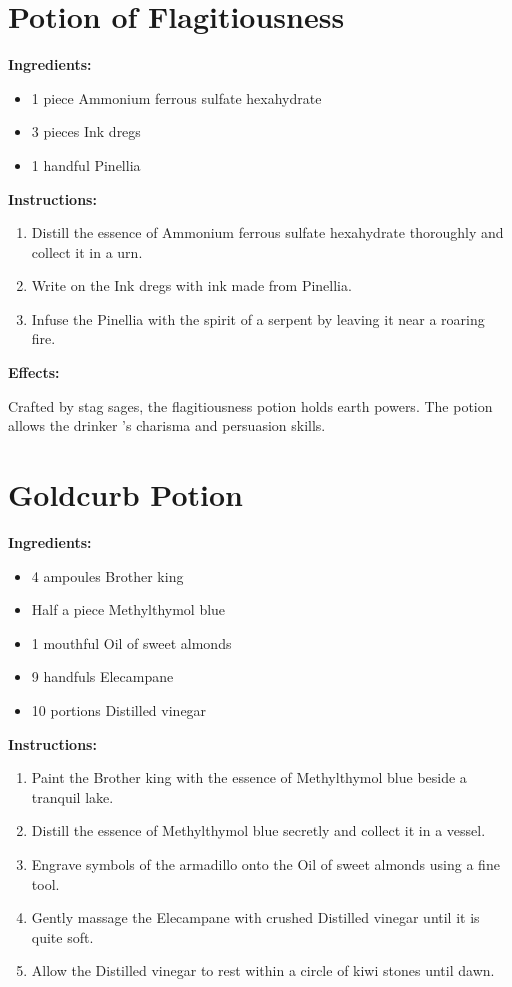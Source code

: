 \documentclass{article}
\begin{document}
\newpage
\section*{Potion of Flagitiousness}

\textbf{Ingredients:}

\begin{itemize}
  \item 1 piece Ammonium ferrous sulfate hexahydrate
  \item 3 pieces Ink dregs
  \item 1 handful Pinellia
\end{itemize}

\textbf{Instructions:}

\begin{enumerate}
  \item Distill the essence of Ammonium ferrous sulfate hexahydrate thoroughly and collect it in a urn.
  \item Write on the Ink dregs with ink made from Pinellia.
  \item Infuse the Pinellia with the spirit of a serpent by leaving it near a roaring fire.
\end{enumerate}

\textbf{Effects:}

Crafted by stag sages, the flagitiousness potion holds earth powers. The potion allows the drinker 's charisma and persuasion skills.

\newpage
\section*{Goldcurb Potion}

\textbf{Ingredients:}

\begin{itemize}
  \item 4 ampoules Brother king
  \item Half a piece Methylthymol blue
  \item 1 mouthful Oil of sweet almonds
  \item 9 handfuls Elecampane
  \item 10 portions Distilled vinegar
\end{itemize}

\textbf{Instructions:}

\begin{enumerate}
  \item Paint the Brother king with the essence of Methylthymol blue beside a tranquil lake.
  \item Distill the essence of Methylthymol blue secretly and collect it in a vessel.
  \item Engrave symbols of the armadillo onto the Oil of sweet almonds using a fine tool.
  \item Gently massage the Elecampane with crushed Distilled vinegar until it is quite soft.
  \item Allow the Distilled vinegar to rest within a circle of kiwi stones until dawn.
\end{enumerate}
\end{document}
